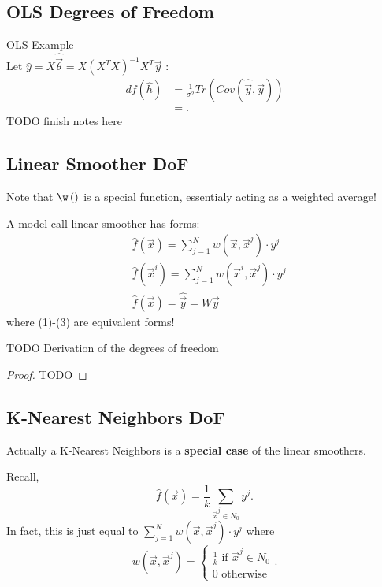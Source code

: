 \documentclass[a4paper]{article}
\begin{document}
\subsection{OLS Degrees of Freedom}
\begin{note}{OLS Example} \\
  Let $\hat{y} = X \hat{\vec{\theta}} = X(X^TX)^{-1} X^T \vec{y}$ :
  \begin{align*}
    df(\hat{h}) &= \frac{1}{\sigma^2} Tr(Cov(\hat{\vec{y}}, \vec{y})) \\
                &=
  .\end{align*}
  TODO finish notes here
\end{note}

\subsection{Linear Smoother DoF}
Note that $\w\left(  \right)$ is a special function, essentialy acting as a weighted average!

\begin{definition}
  A model call linear smoother has forms:
  \begin{align}
    & \hat{f}\left( \vec{x} \right) = \sum_{j=1}^N w(\vec{x}, \vec{x}^j) \cdot y^j \\
    & \hat{f}\left( \vec{x}^i \right) = \sum_{j=1}^N w(\vec{x}^i, \vec{x}^j) \cdot y^j \\
    & \hat{f}\left( \vec{x} \right) = \hat{\vec{y}} = W \vec{y} 
  \end{align}
  where (1)-(3) are equivalent forms!
\end{definition}

TODO Derivation of the degrees of freedom
\begin{proof}
  TODO
\end{proof}

\subsection{K-Nearest Neighbors DoF}
\begin{remark}
  Actually a K-Nearest Neighbors is a \textbf{special case} of the linear smoothers.
\end{remark}

Recall,
\[
  \hat{f}(\vec{x}) = \frac{1}{k} \sum_{\vec{x}^j \in N_0} y^j 
.\] 
In fact, this is just equal to $\sum_{j=1}^N w\left( \vec{x}, \vec{x}^j \right) \cdot  y^{j}$  where
\[
  w\left( \vec{x}, \vec{x}^j \right) = \begin{cases}
    \frac{1}{k} \text{ if $\vec{x}^j \in N_0$} \\
      0 \text{ otherwise}
  \end{cases} 
.\] 
\end{document}
